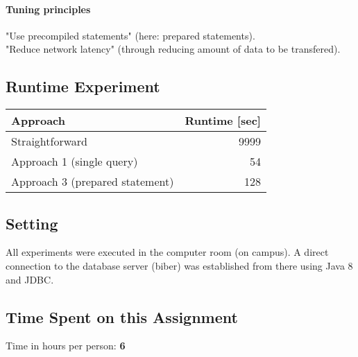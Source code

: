 \documentclass[11pt]{scrartcl}
\begin{document}
  \paragraph{Tuning principles}
  
	"Use precompiled statements" (here: prepared statements).
	\\
  	"Reduce network latency" (through reducing amount of data to be transfered).

  \subsection*{Runtime Experiment}
  \begin{table}[H]
  \begin{tabular}{l|r}
    Approach & Runtime [sec] \\
    \hline
    Straightforward & 9999 \\
    Approach 1 (single query) & 54 \\
    Approach 3 (prepared statement) & 128
  \end{tabular}
  \end{table}

  \bigskip
  
  \subsection*{Setting}
  All experiments were executed in the computer room (on campus). A direct connection to the database server (biber) was established from there using Java 8 and JDBC.

  \subsection*{Time Spent on this Assignment}

  Time in hours per person: {\textbf 6}
\end{document}

